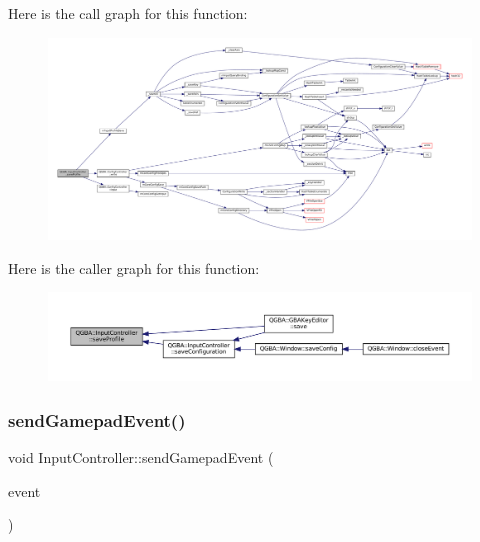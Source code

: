 Here is the call graph for this function\+:
\nopagebreak
\begin{figure}[H]
\begin{center}
\leavevmode
\includegraphics[width=350pt]{class_q_g_b_a_1_1_input_controller_a9efdf161c3186274d0ddcaa1f4e9e56b_cgraph}
\end{center}
\end{figure}
Here is the caller graph for this function\+:
\nopagebreak
\begin{figure}[H]
\begin{center}
\leavevmode
\includegraphics[width=350pt]{class_q_g_b_a_1_1_input_controller_a9efdf161c3186274d0ddcaa1f4e9e56b_icgraph}
\end{center}
\end{figure}
\mbox{\label{class_q_g_b_a_1_1_input_controller_a56d481c42593a40d448bcfd2d385a392}} 
\subsubsection{\texorpdfstring{send\+Gamepad\+Event()}{sendGamepadEvent()}}
{\footnotesize\ttfamily void Input\+Controller\+::send\+Gamepad\+Event (\begin{DoxyParamCaption}\item[{Q\+Event $\ast$}]{event }\end{DoxyParamCaption})\hspace{0.3cm}{\ttfamily [private]}}

